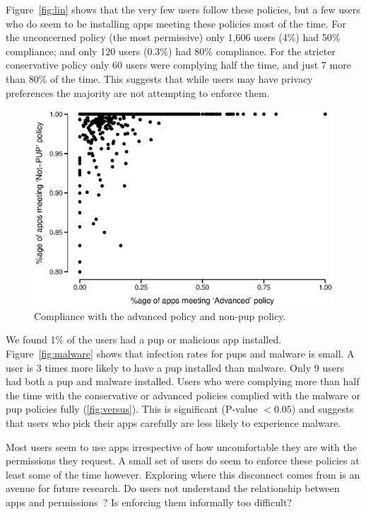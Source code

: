 \documentclass[]{llncs}
\begin{document}
Figure~\ref{fig:lin} shows that the very few users follow these policies, but a few users who do seem to be installing apps meeting these policies most of the time.
For the unconcerned policy (the most permissive) only 1,606 users (4\%) had 50\% compliance;
  and only 120 users (0.3\%) had 80\% compliance.
For the stricter conservative policy only 60 users were complying half the time, and just 7 more than 80\% of the time.
This suggests that while users may have privacy preferences the majority are not attempting to enforce them.

\begin{figure}\centering
  \includegraphics[width=\linewidth]{./figures/c_v_pup.eps}
  \caption{Compliance with the advanced policy and non-\ac{pup} policy.}
  \label{fig:versus}
\end{figure}

We found 1\% of the users had a \ac{pup} or malicious app installed.
Figure~\ref{fig:malware} shows that infection rates for \ac{pup}s and malware is small.
A user is 3 times more likely to have a \ac{pup} installed than malware.
Only 9 users had both a \ac{pup} and malware installed.
Users who were complying more than half the time with the conservative or advanced policies complied with the malware or \ac{pup} policies fully (\autoref{fig:versus}).
This is significant (P-value $< 0.05$) and suggests that users who pick their apps carefully are less likely to experience malware.

Most users seem to use apps irrespective of how uncomfortable they are with the permissions they request.
A small set of users do seem to enforce these policies at least some of the time however.
Exploring where this disconnect comes from is an avenue for future research.
Do users not understand the relationship between apps and permissions~\cite{Felt:2012hma}?
Is enforcing them informally too difficult?
\end{document}
